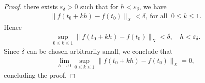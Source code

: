 \documentclass[12pt,reqno]{amsart}
\numberwithin{equation}{section}  %
\numberwithin{figure}{section}
\newcommand{\ee}{\varepsilon}
\theoremstyle{plain}
\theoremstyle{definition}
\theoremstyle{remark}
\begin{document}
\begin{proof}
there exists $\ee_{\delta} > 0$ such that for $h < \ee_{\delta}$, we have
%
%
\begin{equation*}
\begin{split}
  \| f(t_{0} + kh) - f(t_{0}) \|_{X} < \delta, \ \text{for all } \  0 \le k \le 1.
\end{split}
\end{equation*}
%
%
Hence
%
%
%
\begin{equation*}
\begin{split}
  \sup_{0 \le k \le 1} \| f(t_{0} + kh) - f(t_{0}) \|_{X} < \delta, \quad h <
  \ee_{\delta}.
\end{split}
\end{equation*}
%
%
Since $\delta$ can be chosen arbitrarily small, we conclude that
%
\begin{equation*}
\begin{split}
  \lim_{h \to 0} \sup_{0 \le k \le 1} \| f(t_{0} + kh) - f(t_{0})
  \|_{X} = 0,
\end{split}
\end{equation*}
%
%
concluding the proof.
\end{proof}
%
%
%
%
%
%
%
%
%
%
%
%
%
%
\end{document}
